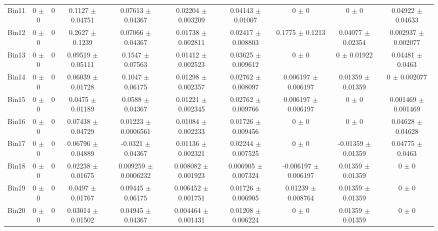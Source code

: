\begin{tabular}{@{\extracolsep{4pt}}lccccccccc@{}}
     Bin11 & 0 $\pm$ 0 & 0 & 0.1127 $\pm$ 0.04751 & 0.07613 $\pm$ 0.04367 & 0.02204 $\pm$ 0.003209 & 0.04143 $\pm$ 0.01007 & 0 $\pm$ 0 & 0 $\pm$ 0 & 0.04922 $\pm$ 0.04633 \\ 
     Bin12 & 0 $\pm$ 0 & 0 & 0.2627 $\pm$ 0.1239 & 0.07066 $\pm$ 0.04367 & 0.01738 $\pm$ 0.002811 & 0.02417 $\pm$ 0.008803 & 0.1775 $\pm$ 0.1213 & 0.04077 $\pm$ 0.02354 & 0.002937 $\pm$ 0.002077 \\ 
     Bin13 & 0 $\pm$ 0 & 0 & 0.09519 $\pm$ 0.05111 & 0.1547 $\pm$ 0.07563 & 0.01412 $\pm$ 0.002523 & 0.03625 $\pm$ 0.009612 & 0 $\pm$ 0 & 0 $\pm$ 0.01922 & 0.04481 $\pm$ 0.0463 \\ 
     Bin14 & 0 $\pm$ 0 & 0 & 0.06039 $\pm$ 0.01728 & 0.1047 $\pm$ 0.06175 & 0.01298 $\pm$ 0.002357 & 0.02762 $\pm$ 0.008097 & 0.006197 $\pm$ 0.006197 & 0.01359 $\pm$ 0.01359 & 0 $\pm$ 0.002077 \\ 
     Bin15 & 0 $\pm$ 0 & 0 & 0.0475 $\pm$ 0.01189 & 0.0588 $\pm$ 0.04367 & 0.01221 $\pm$ 0.002345 & 0.02762 $\pm$ 0.009766 & 0.006197 $\pm$ 0.006197 & 0 $\pm$ 0 & 0.001469 $\pm$ 0.001469 \\ 
     Bin16 & 0 $\pm$ 0 & 0 & 0.07438 $\pm$ 0.04729 & 0.01223 $\pm$ 0.0006561 & 0.01084 $\pm$ 0.002233 & 0.01726 $\pm$ 0.009456 & 0 $\pm$ 0 & 0 $\pm$ 0 & 0.04628 $\pm$ 0.04628 \\ 
     Bin17 & 0 $\pm$ 0 & 0 & 0.06796 $\pm$ 0.04889 & -0.0321 $\pm$ 0.04367 & 0.01136 $\pm$ 0.002321 & 0.02244 $\pm$ 0.007525 & 0 $\pm$ 0 & -0.01359 $\pm$ 0.01359 & 0.04775 $\pm$ 0.0463 \\ 
     Bin18 & 0 $\pm$ 0 & 0 & 0.02238 $\pm$ 0.01675 & 0.009259 $\pm$ 0.0006232 & 0.008082 $\pm$ 0.001923 & 0.006905 $\pm$ 0.007324 & -0.006197 $\pm$ 0.006197 & 0.01359 $\pm$ 0.01359 & 0 $\pm$ 0 \\ 
     Bin19 & 0 $\pm$ 0 & 0 & 0.0497 $\pm$ 0.01767 & 0.09445 $\pm$ 0.06175 & 0.006452 $\pm$ 0.001751 & 0.01726 $\pm$ 0.006905 & 0.01239 $\pm$ 0.008764 & 0.01359 $\pm$ 0.01359 & 0 $\pm$ 0 \\ 
     Bin20 & 0 $\pm$ 0 & 0 & 0.03014 $\pm$ 0.01502 & 0.04945 $\pm$ 0.04367 & 0.004464 $\pm$ 0.001431 & 0.01208 $\pm$ 0.006224 & 0 $\pm$ 0 & 0.01359 $\pm$ 0.01359 & 0 $\pm$ 0 \\ 
\hline\hline
  \end{tabular}
